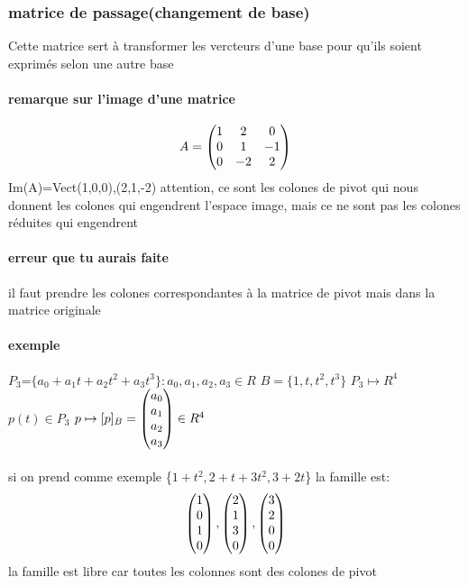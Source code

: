\documentclass[a4paper,10pt]{article}
\begin{document}
\subsubsection{matrice de passage(changement de base)}
Cette matrice sert à transformer les vercteurs d'une base pour qu'ils soient exprimés selon une autre base
\paragraph{remarque sur l'image d'une matrice}
\[
A=
\begin{pmatrix}
1&2&0\cr
0&1&-1\cr
0&-2&2\cr
\end{pmatrix}
\]
\newline
Im(A)=Vect(1,0,0),(2,1,-2) attention, ce sont les colones de pivot qui nous donnent les colones qui engendrent l'espace image, mais ce ne sont pas les colones réduites qui engendrent
\newline
\paragraph{erreur que tu aurais faite}
il faut prendre les colones correspondantes à la matrice de pivot mais dans la matrice originale
\paragraph{exemple}
$P_3$=$\{a_0+a_1t+a_2t^2+a_3t^3\}:a_0,a_1,a_2,a_3\in R$
\newline
$B=\{1,t,t^2,t^3\}$
\newline
$P_3\mapsto R^4$
\newline
$p(t)\in P_3$
\newline
$p\mapsto [p]_B=
\begin{pmatrix}
 a_0\cr
 a_1\cr
 a_2\cr
 a_3\cr
\end{pmatrix}
\in R^4
$
\paragraph{}
si on prend comme exemple \{$1+t^2,2+t+3t^2,3+2t$\}
\newline
la famille est:
\[
\begin{pmatrix}
1\cr
0\cr
1\cr
0\cr
\end{pmatrix}
,
\begin{pmatrix}
2\cr
1\cr
3\cr
0\cr
\end{pmatrix}
,
\begin{pmatrix}
3\cr
2\cr
0\cr
0\cr
\end{pmatrix}
\]
\newline
la famille est libre car toutes les colonnes sont des colones de pivot
\end{document}
